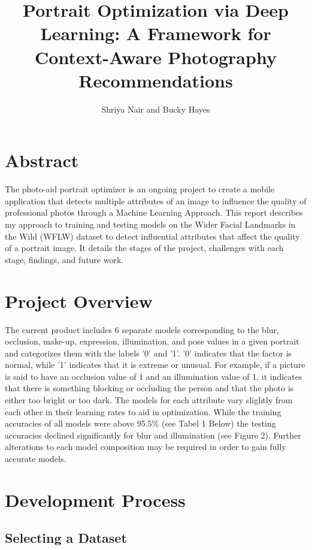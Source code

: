 \documentclass{article}
\title{Portrait Optimization via Deep Learning: A Framework for Context-Aware Photography Recommendations}
\author{Shriya Nair and Bucky Hayes}
\begin{document}
\maketitle

\section{Abstract}

The photo-aid portrait optimizer is an ongoing project to create a mobile application that detects multiple attributes of an image to influence the quality of professional photos through a Machine Learning Approach. This report describes my approach to training and testing models on the Wider Facial Landmarks in the Wild (WFLW) dataset to detect influential attributes that affect the quality of a portrait image. It details the stages of the project, challenges with each stage, findings, and future work. 

\section{Project Overview}

The current product includes 6 separate models corresponding to the blur, occlusion, make-up, expression, illumination, and pose values in a given portrait and categorizes them with the labels '0' and '1'. '0' indicates that the factor is normal, while '1' indicates that it is extreme or unusual. For example, if a picture is said to have an occlusion value of 1 and an illumination value of 1, it indicates that there is something blocking or occluding the person and that the photo is either too bright or too dark. The models for each attribute vary slightly from each other in their learning rates to aid in optimization. While the training accuracies of all models were above 95.5\% (see Tabel 1 Below) the testing accuracies declined significantly for blur and illumination (see Figure 2). Further alterations to each model composition may be required in order to gain fully accurate models. 


\section{Development Process}

\subsection{Selecting a Dataset}
\end{document}
